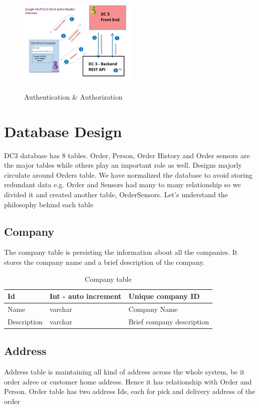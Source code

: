 \begin{figure}[!ht]
	\centering
	\includegraphics[width=0.5\textwidth]{images/GoogleAuth.jpeg}\\
	\caption{Authentication \& Authorization}
	\label{fig:Authentication and Authorization}
\end{figure}


\section{Database Design}
DC3 database has 8 tables. Order, Person, Order History and Order sensors are the major tables while others play an important role as well.  Designs majorly circulate around Orders table. We have normalized the database to avoid storing redundant data e.g. Order and Sensors had many to many relationship so we divided it and created another table, OrderSensors. Let’s understand the philosophy behind each table


\subsection{Company}
The company table is persisting the information about all the companies. It stores the company name and a brief description of the company. 

\begin{table}[!ht]
	\centering
	\begin{tabular}{ |l|l|l| }
		\hline
		Id & Int - auto increment & Unique company ID \\
		\hline
		Name & varchar & Company Name \\
		\hline
		Description & varchar & Brief company description \\
		\hline
	\end{tabular}
	\caption{Company table}
\end{table}



\subsection{Address}
Address table is maintaining all kind of address across the whole system, be it order adree or customer home address. Hence it has relationship with Order and Person. Order table has two address Ids, each for pick and delivery address of the order



